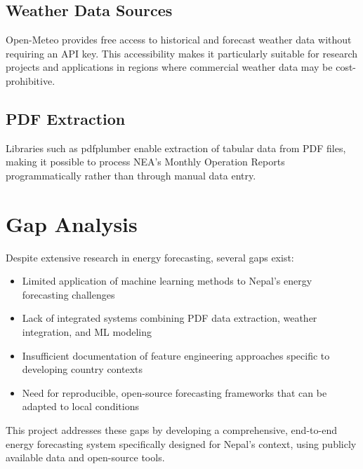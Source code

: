         \subsection{Weather Data Sources}
        Open-Meteo provides free access to historical and forecast weather data without requiring an API key. This accessibility makes it particularly suitable for research projects and applications in regions where commercial weather data may be cost-prohibitive.

        \subsection{PDF Extraction}
        Libraries such as pdfplumber enable extraction of tabular data from PDF files, making it possible to process NEA's Monthly Operation Reports programmatically rather than through manual data entry.

    \section{Gap Analysis}
        Despite extensive research in energy forecasting, several gaps exist:

        \begin{itemize}
            \item Limited application of machine learning methods to Nepal's energy forecasting challenges
            \item Lack of integrated systems combining PDF data extraction, weather integration, and ML modeling
            \item Insufficient documentation of feature engineering approaches specific to developing country contexts
            \item Need for reproducible, open-source forecasting frameworks that can be adapted to local conditions
        \end{itemize}

        This project addresses these gaps by developing a comprehensive, end-to-end energy forecasting system specifically designed for Nepal's context, using publicly available data and open-source tools.
